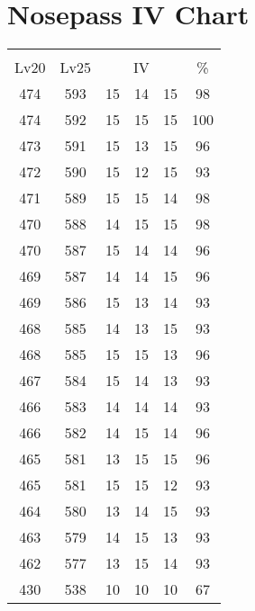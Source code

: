 \documentclass{article}%
\begin{document}
%
\normalsize%
\section{Nosepass IV Chart}%
\label{sec:Nosepass IV Chart}%
\renewcommand{\arraystretch}{1.5}%
\begin{tabular}{|c|c|c|c|c|c|}%
\hline%
\multicolumn{6}{|c|}{\textcolor{white}{ 
\linebreak{Nosepass}
}%
\cellcolor{black}}\\%
\multicolumn{1}{|c}{Lv20}&\multicolumn{1}{c|}{Lv25}&\multicolumn{3}{c|}{IV}&\multicolumn{1}{|c|}{\%}\\%
\hline%
\rowcolor{color98}%
474&593&15&14&15&98\\%
\hline%
\rowcolor{color100}%
474&592&15&15&15&100\\%
\hline%
\rowcolor{color96}%
473&591&15&13&15&96\\%
\hline%
\rowcolor{color93}%
472&590&15&12&15&93\\%
\hline%
\rowcolor{color98}%
471&589&15&15&14&98\\%
\hline%
\rowcolor{color98}%
470&588&14&15&15&98\\%
\hline%
\rowcolor{color96}%
470&587&15&14&14&96\\%
\hline%
\rowcolor{color96}%
469&587&14&14&15&96\\%
\hline%
\rowcolor{color93}%
469&586&15&13&14&93\\%
\hline%
\rowcolor{color93}%
468&585&14&13&15&93\\%
\hline%
\rowcolor{color96}%
468&585&15&15&13&96\\%
\hline%
\rowcolor{color93}%
467&584&15&14&13&93\\%
\hline%
\rowcolor{color93}%
466&583&14&14&14&93\\%
\hline%
\rowcolor{color96}%
466&582&14&15&14&96\\%
\hline%
\rowcolor{color96}%
465&581&13&15&15&96\\%
\hline%
\rowcolor{color93}%
465&581&15&15&12&93\\%
\hline%
\rowcolor{color93}%
464&580&13&14&15&93\\%
\hline%
\rowcolor{color93}%
463&579&14&15&13&93\\%
\hline%
\rowcolor{color93}%
462&577&13&15&14&93\\%
\hline%
\rowcolor{color91}%
430&538&10&10&10&67\\%
\end{tabular}

%
\end{document}
